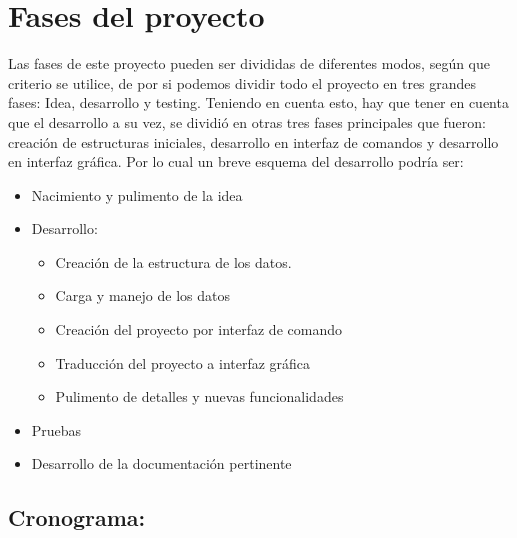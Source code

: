 \section{Fases del proyecto}
Las fases de este proyecto pueden ser divididas de diferentes modos, según que criterio se utilice, de por si podemos dividir todo el proyecto en tres grandes fases: Idea, desarrollo y testing. Teniendo en cuenta esto, hay que tener en cuenta que el desarrollo a su vez, se dividió en otras tres fases principales que fueron: creación de estructuras iniciales, desarrollo en interfaz de comandos y desarrollo en interfaz gráfica. 
Por lo cual un breve esquema del desarrollo podría ser:
\begin{itemize}
\item Nacimiento y pulimento de la idea
\item Desarrollo:
\begin{itemize}
\item Creación de la estructura de los datos.
\item Carga y manejo de los datos
\item Creación del proyecto por interfaz de comando
\item Traducción del proyecto a interfaz gráfica
\item Pulimento de detalles y nuevas funcionalidades
\end{itemize}
\item Pruebas
\item Desarrollo de la documentación pertinente
\end{itemize}
\subsection{Cronograma: }
